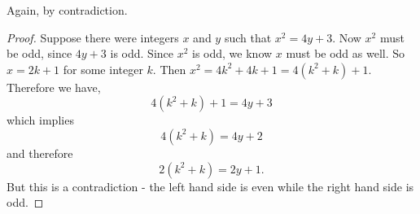 \documentclass[11pt]{exam}
\begin{document}
\begin{questions}
\question Again, by contradiction.
\begin{proof}
  Suppose there were integers $x$ and $y$ such that $x^2 = 4y + 3$.  Now $x^2$ must be odd, since $4y + 3$ is odd.  Since $x^2$ is odd, we know $x$ must be odd as well.  So $x = 2k + 1$ for some integer $k$.  Then $x^2 = 4k^2 + 4k + 1 = 4(k^2 + k) + 1$.  Therefore we have,
  \[4(k^2 + k) + 1 = 4y + 3\]
  which implies
  \[4(k^2 + k) = 4y + 2\]
  and therefore
  \[2(k^2 + k) = 2y + 1.\]
  But this is a contradiction - the left hand side is even while the right hand side is odd. 
\end{proof}



\end{questions}
\end{document}
